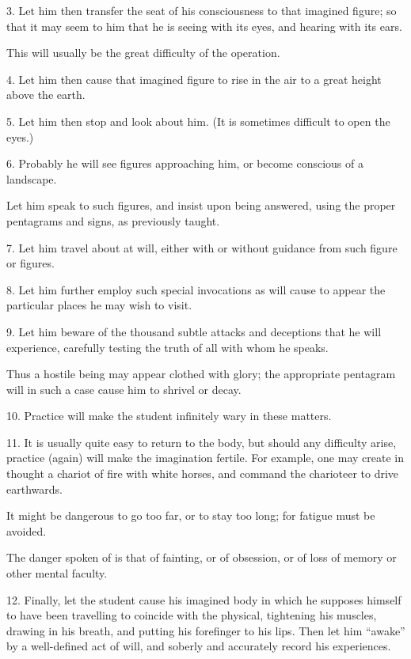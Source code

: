 3. Let him then transfer the seat of his consciousness to that imagined figure; so that it may seem to him that he is seeing with its eyes, and hearing with its ears.

This will usually be the great difficulty of the operation.

4. Let him then cause that imagined figure to rise in the air to a great height above the earth.

5. Let him then stop and look about him. (It is sometimes difficult to open the eyes.)

6. Probably he will see figures approaching him, or become conscious of a landscape.

Let him speak to such figures, and insist upon being answered, using the proper pentagrams and signs, as previously taught.

7. Let him travel about at will, either with or without guidance from such figure or figures.

8. Let him further employ such special invocations as will cause to appear the particular places he may wish to visit.

9. Let him beware of the thousand subtle attacks and deceptions that he will experience, carefully testing the truth of all with whom he speaks.

Thus a hostile being may appear clothed with glory; the appropriate pentagram will in such a case cause him to shrivel or decay.

10. Practice will make the student infinitely wary in these matters.

11. It is usually quite easy to return to the body, but should any difficulty arise, practice (again) will make the imagination fertile. For example, one may create in thought a chariot of fire with white horses, and command the charioteer to drive earthwards.

It might be dangerous to go too far, or to stay too long; for fatigue must be avoided.

The danger spoken of is that of fainting, or of obsession, or of loss of memory or other mental faculty.

12. Finally, let the student cause his imagined body in which he supposes himself to have been travelling to coincide with the physical, tightening his muscles, drawing in his breath, and putting his forefinger to his lips. Then let him \enquote{awake} by a well-defined act of will, and soberly and accurately record his experiences.

